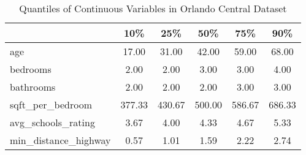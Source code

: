 \begin{table}
\caption{Quantiles of Continuous Variables in Orlando Central Dataset}
\label{tab:quantiles_orlando_c}
\begin{tabular}{lccccc}
\toprule
 & 10\% & 25\% & 50\% & 75\% & 90\% \\
\midrule
age & 17.00 & 31.00 & 42.00 & 59.00 & 68.00 \\
bedrooms & 2.00 & 2.00 & 3.00 & 3.00 & 4.00 \\
bathrooms & 2.00 & 2.00 & 2.00 & 3.00 & 3.00 \\
sqft\_per\_bedroom & 377.33 & 430.67 & 500.00 & 586.67 & 686.33 \\
avg\_schools\_rating & 3.67 & 4.00 & 4.33 & 4.67 & 5.33 \\
min\_distance\_highway & 0.57 & 1.01 & 1.59 & 2.22 & 2.74 \\
\bottomrule
\end{tabular}
\end{table}
